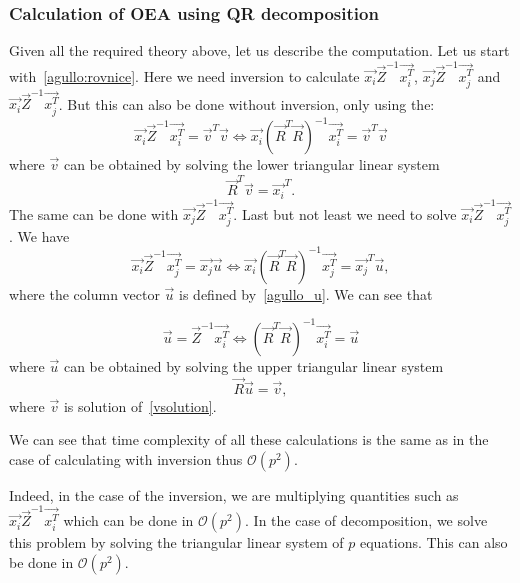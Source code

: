\subsubsection*{Calculation of OEA using QR decomposition}
Given all the required theory above, let us describe the computation. Let us start with~\eqref{agullo:rovnice}. Here we need inversion to calculate 
$\vec{x_i}\vec{Z}^{-1}\vec{x_i^T}$, $\vec{x_j}\vec{Z}^{-1}\vec{x_j^T}$ and $\vec{x_i}\vec{Z}^{-1}\vec{x_j^T}$. But this can also be done without inversion, only using the:
\begin{equation} \label{solveimi}
    \vec{x_i}\vec{Z}^{-1}\vec{x_i^T} = \vec{v}^T\vec{v}     \iff \vec{x_i}(\vec{R}^T\vec{R})^{-1}\vec{x_i^T} = \vec{v}^T\vec{v}
\end{equation} 
where $\vec{v}$ can be obtained by solving the lower triangular linear system
\begin{equation} \label{vsolution}
    \vec{R}^T\vec{v} = \vec{x_i}^T.
\end{equation} 
The same can be done with  $\vec{x_j}\vec{Z}^{-1}\vec{x_j^T}$. Last but not least we need to solve 
$\vec{x_i}\vec{Z}^{-1}\vec{x_j^T}$. We have
\begin{equation}
    \vec{x_i}\vec{Z}^{-1}\vec{x_j^T} = \vec{x_j}\vec{u}     \iff \vec{x_i}(\vec{R}^T\vec{R})^{-1}\vec{x_j^T} = \vec{x_j}^T\vec{u},
\end{equation} 
where the column vector $\vec{u}$ is defined by~\eqref{agullo_u}. We can see that 

\begin{equation}
    \vec{u} = \vec{Z}^{-1}\vec{x_i^T}     \iff (\vec{R}^T\vec{R})^{-1}\vec{x_i^T} = \vec{u}
\end{equation}
where $\vec{u}$ can be obtained by solving the upper triangular linear system 
\begin{equation} \label{solve_u_qr}
    \vec{R}\vec{u} = \vec{v},
\end{equation}
where $\vec{v}$ is solution of~\eqref{vsolution}. 


We can see that time complexity of all these calculations is the same as in the case of calculating with inversion thus $\mathcal{O}(p^2)$.

Indeed, in the case of the inversion, we are multiplying quantities such as $\vec{x_i}\vec{Z}^{-1}\vec{x_i^T}$ which can be done in $\mathcal{O}(p^2)$.
In the case of decomposition, we solve this problem by solving the triangular linear system of $p$ equations. This can also be done in $\mathcal{O}(p^2)$.


